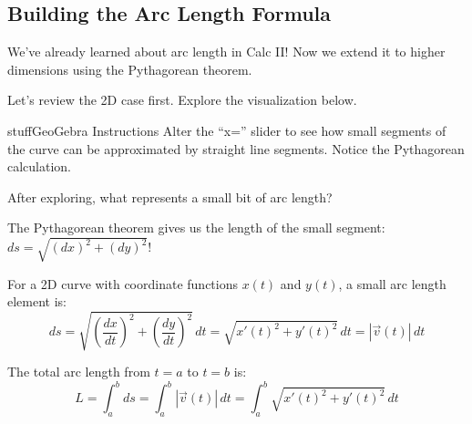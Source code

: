 \documentclass{ximera}
\begin{document}
\subsection*{Building the Arc Length Formula}

We've already learned about arc length in Calc II! Now we extend it to higher dimensions using the Pythagorean theorem.

\begin{problem}
Let's review the 2D case first. Explore the visualization below.

\begin{expandable}{stuff}{GeoGebra Instructions}
    Alter the ``x='' slider to see how small segments of the curve can be approximated by straight line segments. Notice the Pythagorean calculation.
\end{expandable}

\begin{center}
\end{center}

After exploring, what represents a small bit of arc length?
\begin{multipleChoice}
\end{multipleChoice}

\begin{feedback}
The Pythagorean theorem gives us the length of the small segment: $ds = \sqrt{(dx)^2 + (dy)^2}$!
\end{feedback}
\end{problem}

\begin{definition}
For a 2D curve with coordinate functions $x(t)$ and $y(t)$, a small arc length element is:
$$ds=\sqrt{\left(\frac{dx}{dt}\right)^2+\left(\frac{dy}{dt}\right)^2} \, dt=\sqrt{x'(t)^2+y'(t)^2} \, dt = |\vec{v}(t)| \, dt$$

The total arc length from $t=a$ to $t=b$ is:
$$L = \int_a^b ds = \int_a^b |\vec{v}(t)| \, dt = \int_a^b \sqrt{x'(t)^2+y'(t)^2} \, dt$$
\end{definition}
\end{document}
